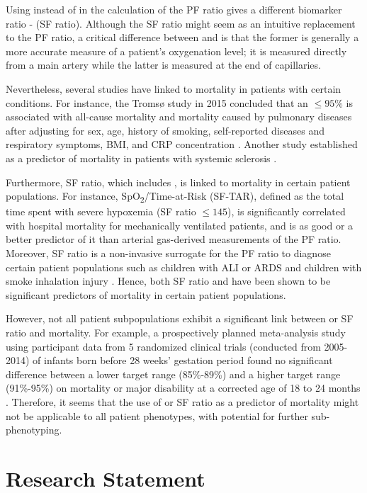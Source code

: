 Using \Sp instead of \Pa in the calculation of the PF ratio gives a different biomarker ratio - \SF (SF ratio). Although the SF ratio might seem as an intuitive replacement to the PF ratio, a critical difference between \Pa and \Sp is that the former is generally a more accurate measure of a patient's oxygenation level; it is measured directly from a main artery while the latter is measured at the end of capillaries. 

Nevertheless, several studies have linked \Sp to mortality in patients with certain conditions. For instance, the Tromsø study in 2015 concluded that an \Sp $\leq95\%$ is associated with all-cause mortality and mortality caused by pulmonary diseases after adjusting for sex, age, history of smoking, self-reported diseases and respiratory symptoms, BMI, and CRP concentration \citep{vold2015low}. Another study established \Sp as a predictor of mortality in patients with systemic sclerosis  \citep{swigris2009exercise}. 

Furthermore, SF ratio, which includes \Sp, is linked to mortality in certain patient populations. For instance, SpO\textsubscript{2}/\Fi Time-at-Risk (SF-TAR), defined as the total time spent with severe hypoxemia (SF ratio $\leq 145$), is  significantly correlated with hospital mortality for mechanically ventilated patients, and is as good or a better predictor of it than arterial gas-derived measurements of the PF ratio. Moreover, SF ratio is a non-invasive surrogate for the PF ratio to diagnose certain patient populations such as children with ALI or ARDS \citep{rice2007comparison} and children with smoke inhalation injury \citep{cambiaso2017correlation}. Hence, both SF ratio and \Sp have been shown to be significant predictors of mortality in certain patient populations. 

However, not all patient subpopulations exhibit a significant link between \Sp or SF ratio and mortality. For example, a prospectively planned meta-analysis study using participant data from 5 randomized clinical trials (conducted from 2005-2014) of infants born before 28 weeks' gestation period found no significant difference between a lower \Sp target range (85\%-89\%) and a higher \Sp target range (91\%-95\%) on mortality or major disability at a corrected age of 18 to 24 months \citep{askie2018association}. Therefore, it seems that the use of \Sp or SF ratio as a predictor of mortality might not be applicable to all patient phenotypes, with potential for further sub-phenotyping. 


\section{Research Statement} 

